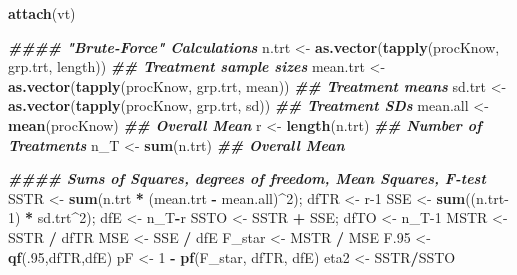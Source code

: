 \documentclass[
]{book}
\newenvironment{Shaded}{\begin{snugshade}}{\end{snugshade}}
\newcommand{\DecValTok}[1]{\textcolor[rgb]{0.00,0.00,0.81}{#1}}
\newcommand{\DocumentationTok}[1]{\textcolor[rgb]{0.56,0.35,0.01}{\textbf{\textit{#1}}}}
\newcommand{\FloatTok}[1]{\textcolor[rgb]{0.00,0.00,0.81}{#1}}
\newcommand{\FunctionTok}[1]{\textcolor[rgb]{0.13,0.29,0.53}{\textbf{#1}}}
\newcommand{\NormalTok}[1]{#1}
\newcommand{\OtherTok}[1]{\textcolor[rgb]{0.56,0.35,0.01}{#1}}
\newcommand{\SpecialCharTok}[1]{\textcolor[rgb]{0.81,0.36,0.00}{\textbf{#1}}}
\begin{document}
\begin{Shaded}
\begin{Highlighting}[]
\FunctionTok{attach}\NormalTok{(vt)}

\DocumentationTok{\#\#\#\# "Brute{-}Force" Calculations  }
\NormalTok{n.trt }\OtherTok{\textless{}{-}} \FunctionTok{as.vector}\NormalTok{(}\FunctionTok{tapply}\NormalTok{(procKnow, grp.trt, length))   }\DocumentationTok{\#\# Treatment sample sizes}
\NormalTok{mean.trt }\OtherTok{\textless{}{-}} \FunctionTok{as.vector}\NormalTok{(}\FunctionTok{tapply}\NormalTok{(procKnow, grp.trt, mean))  }\DocumentationTok{\#\# Treatment means}
\NormalTok{sd.trt }\OtherTok{\textless{}{-}} \FunctionTok{as.vector}\NormalTok{(}\FunctionTok{tapply}\NormalTok{(procKnow, grp.trt, sd))      }\DocumentationTok{\#\# Treatment SDs}
\NormalTok{mean.all }\OtherTok{\textless{}{-}} \FunctionTok{mean}\NormalTok{(procKnow)                              }\DocumentationTok{\#\# Overall Mean}
\NormalTok{r }\OtherTok{\textless{}{-}} \FunctionTok{length}\NormalTok{(n.trt)                                      }\DocumentationTok{\#\# Number of Treatments}
\NormalTok{n\_T }\OtherTok{\textless{}{-}} \FunctionTok{sum}\NormalTok{(n.trt)                                       }\DocumentationTok{\#\# Overall Mean}

\DocumentationTok{\#\#\#\# Sums of Squares, degrees of freedom, Mean Squares, F{-}test}
\NormalTok{SSTR }\OtherTok{\textless{}{-}} \FunctionTok{sum}\NormalTok{(n.trt }\SpecialCharTok{*}\NormalTok{ (mean.trt }\SpecialCharTok{{-}}\NormalTok{ mean.all)}\SpecialCharTok{\^{}}\DecValTok{2}\NormalTok{);    dfTR }\OtherTok{\textless{}{-}}\NormalTok{ r}\DecValTok{{-}1}      
\NormalTok{SSE }\OtherTok{\textless{}{-}} \FunctionTok{sum}\NormalTok{((n.trt}\DecValTok{{-}1}\NormalTok{) }\SpecialCharTok{*}\NormalTok{ sd.trt}\SpecialCharTok{\^{}}\DecValTok{2}\NormalTok{);                dfE }\OtherTok{\textless{}{-}}\NormalTok{ n\_T}\SpecialCharTok{{-}}\NormalTok{r}
\NormalTok{SSTO }\OtherTok{\textless{}{-}}\NormalTok{ SSTR }\SpecialCharTok{+}\NormalTok{ SSE;                              dfTO }\OtherTok{\textless{}{-}}\NormalTok{ n\_T}\DecValTok{{-}1}
\NormalTok{MSTR }\OtherTok{\textless{}{-}}\NormalTok{ SSTR }\SpecialCharTok{/}\NormalTok{ dfTR}
\NormalTok{MSE }\OtherTok{\textless{}{-}}\NormalTok{ SSE }\SpecialCharTok{/}\NormalTok{ dfE}
\NormalTok{F\_star }\OtherTok{\textless{}{-}}\NormalTok{ MSTR }\SpecialCharTok{/}\NormalTok{ MSE}
\NormalTok{F}\FloatTok{.95} \OtherTok{\textless{}{-}} \FunctionTok{qf}\NormalTok{(.}\DecValTok{95}\NormalTok{,dfTR,dfE)}
\NormalTok{pF }\OtherTok{\textless{}{-}} \DecValTok{1} \SpecialCharTok{{-}} \FunctionTok{pf}\NormalTok{(F\_star, dfTR, dfE)}
\NormalTok{eta2 }\OtherTok{\textless{}{-}}\NormalTok{ SSTR}\SpecialCharTok{/}\NormalTok{SSTO}


\end{Highlighting}
\end{Shaded}
\end{document}
